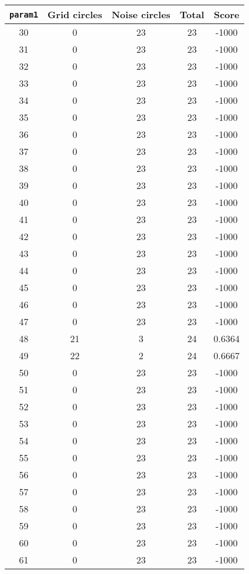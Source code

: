 \documentclass[letterpaper, 12pt]{article}
\begin{document}
\begin{longtable}{|c|c|c|c|c|}
\hline
\textbf{\texttt{param1}} & \textbf{Grid circles} & \textbf{Noise circles} & \textbf{Total} & \textbf{Score} \\
\hline
30 & 0 & 23 & 23 & -1000 \\
\hline
31 & 0 & 23 & 23 & -1000 \\
\hline
32 & 0 & 23 & 23 & -1000 \\
\hline
33 & 0 & 23 & 23 & -1000 \\
\hline
34 & 0 & 23 & 23 & -1000 \\
\hline
35 & 0 & 23 & 23 & -1000 \\
\hline
36 & 0 & 23 & 23 & -1000 \\
\hline
37 & 0 & 23 & 23 & -1000 \\
\hline
38 & 0 & 23 & 23 & -1000 \\
\hline
39 & 0 & 23 & 23 & -1000 \\
\hline
40 & 0 & 23 & 23 & -1000 \\
\hline
41 & 0 & 23 & 23 & -1000 \\
\hline
42 & 0 & 23 & 23 & -1000 \\
\hline
43 & 0 & 23 & 23 & -1000 \\
\hline
44 & 0 & 23 & 23 & -1000 \\
\hline
45 & 0 & 23 & 23 & -1000 \\
\hline
46 & 0 & 23 & 23 & -1000 \\
\hline
47 & 0 & 23 & 23 & -1000 \\
\hline
48 & 21 & 3 & 24 & 0.6364 \\
\hline
49 & 22 & 2 & 24 & 0.6667 \\
\hline
50 & 0 & 23 & 23 & -1000 \\
\hline
51 & 0 & 23 & 23 & -1000 \\
\hline
52 & 0 & 23 & 23 & -1000 \\
\hline
53 & 0 & 23 & 23 & -1000 \\
\hline
54 & 0 & 23 & 23 & -1000 \\
\hline
55 & 0 & 23 & 23 & -1000 \\
\hline
56 & 0 & 23 & 23 & -1000 \\
\hline
57 & 0 & 23 & 23 & -1000 \\
\hline
58 & 0 & 23 & 23 & -1000 \\
\hline
59 & 0 & 23 & 23 & -1000 \\
\hline
60 & 0 & 23 & 23 & -1000 \\
\hline
61 & 0 & 23 & 23 & -1000 \\

\end{longtable}
\end{document}
